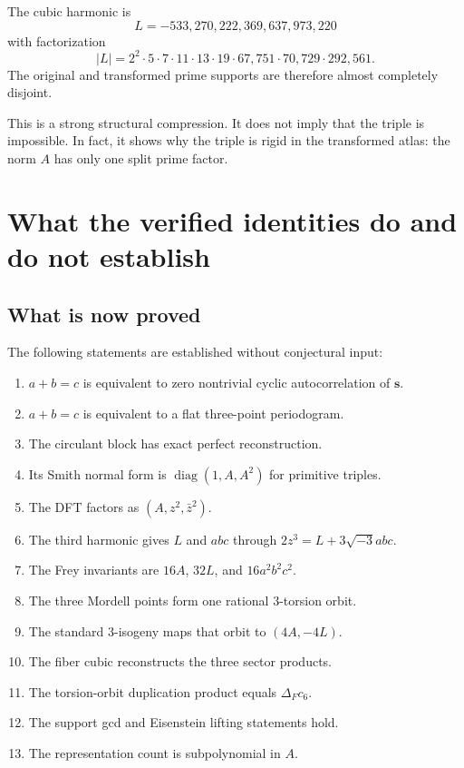 \documentclass[11pt]{article}
\begin{document}
The cubic harmonic is
\[
  L=-533{,}270{,}222{,}369{,}637{,}973{,}220
\]
with factorization
\[
  |L|=2^2\cdot5\cdot7\cdot11\cdot13\cdot19
  \cdot67{,}751\cdot70{,}729\cdot292{,}561.
\]
The original and transformed prime supports are therefore almost completely disjoint.

This is a strong structural compression.  It does not imply that the triple is impossible.  In fact, it shows why the triple is rigid in the transformed atlas: the norm $A$ has only one split prime factor.

\section{What the verified identities do and do not establish}

\subsection{What is now proved}

The following statements are established without conjectural input:

\begin{enumerate}
  \item $a+b=c$ is equivalent to zero nontrivial cyclic autocorrelation of $\mathbf s$.
  \item $a+b=c$ is equivalent to a flat three-point periodogram.
  \item The circulant block has exact perfect reconstruction.
  \item Its Smith normal form is $\operatorname{diag}(1,A,A^2)$ for primitive triples.
  \item The DFT factors as $(A,z^2,\bar z^2)$.
  \item The third harmonic gives $L$ and $abc$ through $2z^3=L+3\sqrt{-3}abc$.
  \item The Frey invariants are $16A$, $32L$, and $16a^2b^2c^2$.
  \item The three Mordell points form one rational $3$-torsion orbit.
  \item The standard $3$-isogeny maps that orbit to $(4A,-4L)$.
  \item The fiber cubic reconstructs the three sector products.
  \item The torsion-orbit duplication product equals $\Delta_Fc_6$.
  \item The support gcd and Eisenstein lifting statements hold.
  \item The representation count is subpolynomial in $A$.
\end{enumerate}
\end{document}

